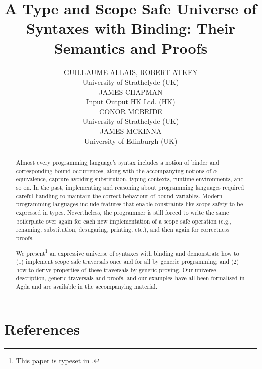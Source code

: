 \documentclass{jfp1}
\title
  [A Type and Scope Safe Universe of Syntaxes with Binding]
  {A Type and Scope Safe Universe of Syntaxes with Binding: Their Semantics and Proofs}
\author[G. Allais et al.]
  {GUILLAUME ALLAIS, ROBERT ATKEY\\
   University of Strathclyde (UK)\\
   JAMES CHAPMAN\\
   Input Output HK Ltd. (HK)\\
   CONOR MCBRIDE\\
   University of Strathclyde (UK)\\
   JAMES MCKINNA\\
   University of Edinburgh (UK)
  }
\begin{document}
\maketitle
\begin{abstract}
Almost every programming language's syntax includes a notion of binder
and corresponding bound occurrences, along with the accompanying
notions of $\alpha$-equivalence, capture-avoiding substitution, typing
contexts, runtime environments, and so on. In the past, implementing
and reasoning about programming languages required careful handling to
maintain the correct behaviour of bound variables. Modern programming
languages include features that enable constraints like scope safety
to be expressed in types. Nevertheless, the programmer is still forced
to write the same boilerplate over again for each new implementation
of a scope safe operation (e.g., renaming, substitution, desugaring,
printing, etc.), and then again for correctness proofs.

We present\footnote{This paper is typeset in .} an expressive universe of syntaxes with binding and
demonstrate how to (1) implement scope safe traversals once and for
all by generic programming; and (2) how to derive properties of these
traversals by generic proving. Our universe description, generic
traversals and proofs, and our examples have all been formalised in
Agda and are available in the accompanying material.
\end{abstract}




\renewcommand{\bibsection}{}
\section*{References}


\end{document}
